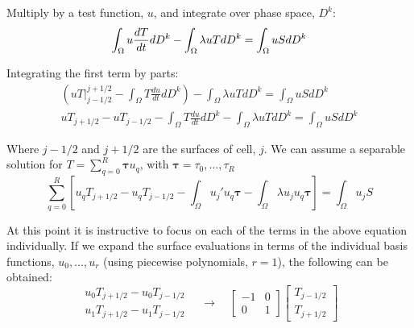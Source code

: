 \documentclass{article}
\def\ds{\displaystyle}
\begin{document}
Multiply by a test function, $u$, and integrate over phase space, $D^k$:
\begin{equation}
\ds\int_{\Omega} u \frac{dT}{dt} dD^k - \ds\int_{\Omega}  \lambda u T dD^k = \ds\int_{\Omega} u S dD^k\\[5pt]
\end{equation}

Integrating the first term by parts:
\begin{gather}
\left( uT\big|_{j-1/2}^{j+1/2} - \ds\int_{\Omega} T \frac{du}{dt}dD^k \right) - \ds\int_{\Omega} \lambda u TdD^k =  \ds\int_{\Omega} u SdD^k \\[5pt]
uT_{j+1/2} - uT_{j-1/2} - \ds\int_{\Omega} T \frac{du}{dt} dD^k- \ds\int_{\Omega} \lambda u T dD^k= \ds\int_{\Omega} uSdD^k
\end{gather}

Where $j-1/2$ and $j+1/2$ are the surfaces of cell, $j$. We can assume a separable solution for $T=\ds\sum_{q=0}^R \bm{\tau} u_q$, with $\bm{\tau} = \tau_0,\dots,\tau_R$
\begin{equation}
\label{eq::five}
\ds\sum_{q=0}^R \left[ u_qT_{j+1/2} - u_qT_{j-1/2} - \ds\int_{\Omega}u_{j}'u_q \bm{\tau} - \ds\int_{\Omega} \lambda u_j u_q \bm{\tau}\right] = \ds\int_{\Omega} u_jS
\end{equation}

At this point it is instructive to focus on each of the terms in the above equation individually. If we expand the surface evaluations in terms of the individual basis functions, $u_0,\dots,u_r$ (using piecewise polynomials, $r=1$), the following can be obtained:
\begin{equation}
\label{eq::Surf}
\begin{matrix}
u_0T_{j+1/2} - u_0T_{j-1/2} \\[5pt]
u_1T_{j+1/2} - u_1T_{j-1/2} 
\end{matrix} 
\quad \to \quad 
\begin{bmatrix} -1 & 0 \\ 0 & 1 \end{bmatrix} \begin{bmatrix} T_{j-1/2}  \\ T_{j+1/2}  \end{bmatrix}
\end{equation}
\end{document}
